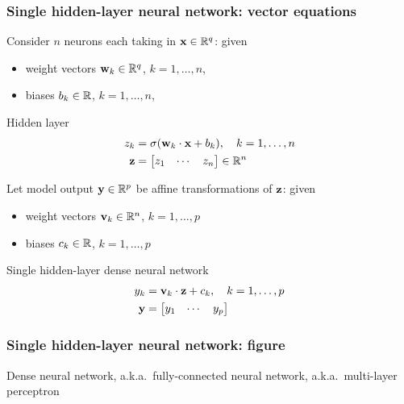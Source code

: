 \begin{frame}
    \frametitle{Single hidden-layer neural network: vector equations}

    Consider $n$ neurons each taking in $\mathbf{x} \in \mathbb{R}^q$: given
    \begin{itemize}
        \item weight vectors $\mathbf{w}_k \in \mathbb{R}^q$, $k = 1, \ldots, n$,
        \item biases $b_k \in \mathbb{R}$, $k = 1, \ldots, n$,
    \end{itemize}
    \begin{block}{Hidden layer}
        \vspace{-1em}
        \begin{align*}
            z_k &= \sigma(\mathbf{w}_k \cdot \mathbf{x} + b_k), \quad k = 1, \ldots, n \\
            \mathbf{z} &= \begin{bmatrix} z_1 & \cdots & z_n \end{bmatrix} \in \mathbb{R}^n
        \end{align*}
    \end{block}
    \pause

    Let model output $\mathbf{y} \in \mathbb{R}^p$ be affine transformations of $\mathbf{z}$: given
    \begin{itemize}
        \item weight vectors $\mathbf{v}_k \in \mathbb{R}^n$, $k = 1, \ldots, p$
        \item biases $c_k \in \mathbb{R}$, $k = 1, \ldots, p$
    \end{itemize}
    \begin{block}{Single hidden-layer dense neural network}
        \vspace{-1em}
        \begin{align*}
            y_k &= \mathbf{v}_k \cdot \mathbf{z} + c_k, \quad k = 1, \ldots, p \\
            \mathbf{y} &= \begin{bmatrix} y_1 & \cdots & y_p \end{bmatrix}
        \end{align*}
    \end{block}
\end{frame}

\begin{frame}
    \frametitle{Single hidden-layer neural network: figure}

    {
        \centering
        
    }
    \vspace{0.5ex}

    Dense neural network, a.k.a.~fully-connected neural network, a.k.a.~multi-layer perceptron
\end{frame}

